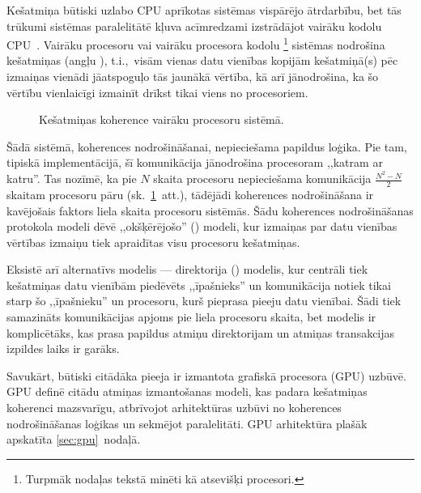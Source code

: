 Kešatmiņa būtiski uzlabo CPU aprīkotas sistēmas vispārējo
ātrdarbību, bet tās trūkumi sistēmas paralelitātē kļuva acīmredzami
izstrādājot vairāku kodolu CPU~\cite{Fatahalian}\cite{Owens-GPU}\cite{Cache}.
Vairāku procesoru vai vairāku procesora kodolu%
\footnote{Turpmāk nodaļas tekstā minēti kā atsevišķi procesori.}
sistēmas nodrošina
kešatmiņas 
(angļu ), t.i.,~visām vienas datu vienības
kopijām kešatmiņā(s) pēc izmaiņas vienādi jāatspoguļo tās
jaunākā vērtība, kā arī jānodrošina, ka šo vērtību vienlaicīgi 
izmainīt drīkst tikai viens no procesoriem.
\begin{figure}[tbh]
	\centering
	\def\svgscale{1.2}
	{}
	\caption{Kešatmiņas koherence vairāku procesoru sistēmā.}
	\label{fig:snoop-bottleneck}
\end{figure}
Šādā sistēmā, koherences nodrošināšanai, nepieciešama papildus loģika.
Pie tam, tipiskā implementācijā, šī komunikācija
jānodrošina procesoram ,,katram ar katru''.
Tas nozīmē, ka pie $N$ skaita
procesoru nepieciešama komunikācija $\frac{N^2-N}{2}$ skaitam procesoru pāru
(sk.~\ref{fig:snoop-bottleneck}~att.), tādējādi koherences nodrošināšana ir
kavējošais faktors liela skaita procesoru sistēmās.
Šādu koherences nodrošināšanas protokola modeli dēvē ,,okšķērējošo''
() modeli, kur izmaiņas par datu vienības vērtības izmaiņu
tiek apraidītas visu procesoru kešatmiņas.
\cite{Cache}

Eksistē arī alternatīvs modelis --- direktorija () modelis,
kur centrāli tiek kešatmiņas datu vienībām piedēvēts ,,īpašnieks''
un komunikācija notiek tikai starp šo ,,īpašnieku'' un procesoru, kurš
pieprasa pieeju datu vienībai. Šādi tiek samazināts komunikācijas apjoms pie
liela procesoru skaita, bet modelis ir komplicētāks, kas prasa papildus
atmiņu direktorijam un atmiņas transakcijas izpildes laiks ir garāks.
\cite{Cache}

Savukārt, būtiski citādāka pieeja ir izmantota grafiskā procesora (GPU)
uzbūvē. GPU definē citādu atmiņas izmantošanas
modeli, kas padara kešatmiņas koherenci mazsvarīgu,
atbrīvojot arhitektūras uzbūvi no koherences nodrošināšanas loģikas un
sekmējot paralelitāti. GPU arhitektūra plašāk apskatīta \ref{sec:gpu}~nodaļā.




